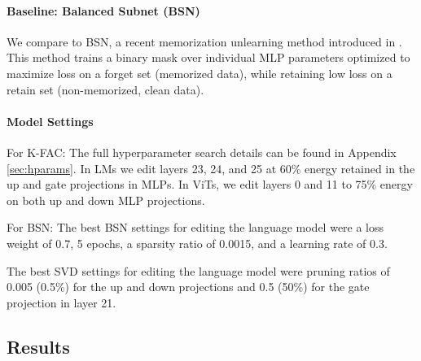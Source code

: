 \documentclass{article} %
\begin{document}
\paragraph{Baseline: Balanced Subnet (BSN)}
We compare to BSN, a recent memorization unlearning method introduced in \citet{sakarvadiamitigating}. This method trains a binary mask over individual MLP parameters optimized to maximize loss on a forget set (memorized data), while retaining low loss on a retain set (non-memorized, clean data). 

\paragraph{Model Settings} 
For K-FAC: The full hyperparameter search details can be found in Appendix \ref{sec:hparams}. In LMs we edit layers 23, 24, and 25 at 60\% energy retained in the up and gate projections in MLPs. In ViTs, we edit layers 0 and 11 to 75\% energy on both up and down MLP projections.

For BSN: The best BSN settings for editing the language model were a loss weight of 0.7, 5 epochs, a sparsity ratio of 0.0015, and a learning rate of 0.3.

The best SVD settings for editing the language model were pruning ratios of 0.005 (0.5\%) for the up and down projections and 0.5 (50\%) for the gate projection in layer 21.


\subsection{Results}
\label{sec:pruning_results}
\end{document}
